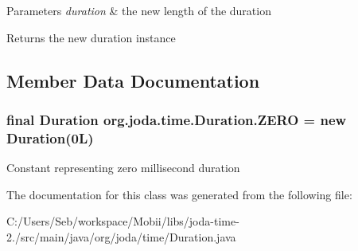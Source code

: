 \begin{DoxyParams}{Parameters}
{\em duration} & the new length of the duration \\
\hline
\end{DoxyParams}
\begin{DoxyReturn}{Returns}
the new duration instance 
\end{DoxyReturn}


\subsection{Member Data Documentation}
\hypertarget{classorg_1_1joda_1_1time_1_1_duration_af02ff2b362e549aa029cafdd89394a53}{
\subsubsection[{Z\-E\-R\-O}]{\setlength{\rightskip}{0pt plus 5cm}final {\bf Duration} org.\-joda.\-time.\-Duration.\-Z\-E\-R\-O = new {\bf Duration}(0\-L)\hspace{0.3cm}{\ttfamily [static]}}}\label{classorg_1_1joda_1_1time_1_1_duration_af02ff2b362e549aa029cafdd89394a53}
Constant representing zero millisecond duration 

The documentation for this class was generated from the following file\-:\begin{DoxyCompactItemize}
\item 
C\-:/\-Users/\-Seb/workspace/\-Mobii/libs/joda-\/time-\/2./src/main/java/org/joda/time/Duration.\-java\end{DoxyCompactItemize}
